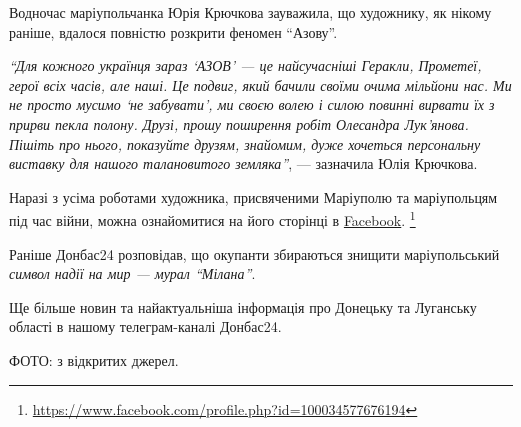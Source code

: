 

Водночас маріупольчанка Юрія Крючкова зауважила, що художнику, як нікому
раніше, вдалося повністю розкрити феномен \enquote{Азову}.

\begin{leftbar}
\emph{\enquote{Для кожного українця зараз \enquote{АЗОВ} — це найсучасніші Геракли, Прометеї,
герої всіх часів, але наші. Це подвиг, який бачили своїми очима мільйони нас.
Ми не просто мусимо \enquote{не забувати}, ми своєю волею і силою повинні вирвати їх з
прирви пекла полону. Друзі, прошу поширення робіт Олесандра Лук'янова. Пішіть
про нього, показуйте друзям, знайомим, дуже хочеться персональну виставку для
нашого талановитого земляка}}, — зазначила Юлія Крючкова.
\end{leftbar}


Наразі з усіма роботами художника, присвяченими Маріуполю та маріупольцям під
час війни, можна ознайомитися на його сторінці в \href{https://www.facebook.com/profile.php?id=100034577676194}{Facebook}.%
\footnote{\url{https://www.facebook.com/profile.php?id=100034577676194}}

Раніше Донбас24 розповідав, що окупанти збираються знищити маріупольський
\emph{символ надії на мир — мурал \enquote{Мілана}}.

Ще більше новин та найактуальніша інформація про Донецьку та Луганську області
в нашому телеграм-каналі Донбас24.

ФОТО: з відкритих джерел.

